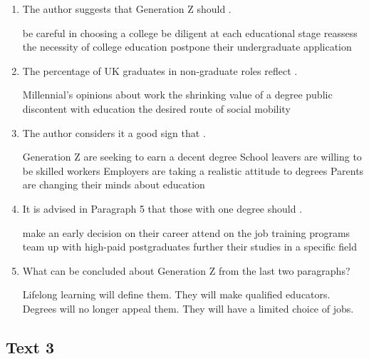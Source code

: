 \begin{enumerate}[resume]
	\item
 The author suggests that Generation Z should \lineread.


\fourchoices
{be careful in choosing a college}
{be diligent at each educational stage}
{reassess the necessity of college education}
{postpone their undergraduate application}


\item
The percentage of UK graduates in non-graduate roles
reflect \lineread.


\fourchoices
{Millennial's opinions about work}
{the shrinking value of a degree}
{public discontent with education}
{the desired route of social mobility}



\item
 The author considers it a good sign that \lineread.


\fourchoices
{Generation Z are seeking to earn a decent degree}
{School leavers are willing to be skilled workers}
{Employers are taking a realistic attitude to degrees}
{Parents are changing their minds about education}



\item
It is advised in Paragraph 5 that those with one degree
should \lineread.


\fourchoices
{make an early decision on their career}
{attend on the job training programs}
{team up with high-paid postgraduates}
{further their studies in a specific field}



\item
What can be concluded about Generation Z from the last two
paragraphs?


\fourchoices
{Lifelong learning will define them.}
{They will make qualified educators.}
{Degrees will no longer appeal them.}
{They will have a limited choice of jobs.}

\end{enumerate}


\newpage
\subsection{Text 3}


